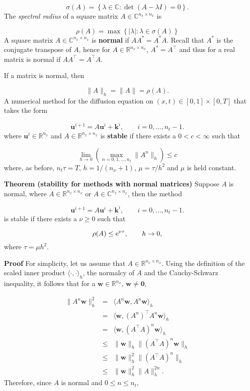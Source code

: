 \documentclass[12pt,a4paper]{article}
\begin{document}
\[
\sigma(A) = \left\lbrace \lambda \in \mathbb{C} : \det(A - \lambda I)= 0  \right\rbrace.
\]
The \emph{spectral radius} of a square matrix $A \in \mathbb{C}^{n_x \times n_x}$ is

\[
\rho(A) = \max\left\lbrace \vert \lambda \vert : \lambda \in \sigma(A)\right\rbrace
\]
A square matrix $A \in \mathbb{C}^{n_x \times n_x}$ is \textbf{normal} if $AA^{*} = A^{*}A$.  Recall that $A^*$ is the conjugate transpose of $A$, hence for  $A \in \mathbb{R}^{n_x \times n_x}$, $A^{*} = A^{\top}$ and thus for a real matrix is normal if $AA^{\top} = A^{\top}A$.

If a matrix is normal, then

\[
\| A \|_h =\| A \| = \rho(A).
\]
A numerical method for the diffusion equation on $(x,t)\in [0, 1]\times[0, T]$ that takes the form

\[
\mathbf{u}^{i+1} = A\mathbf{u}^i + \mathbf{k}^i, \qquad i = 0, \ldots, n_t-1.
\]
where $\mathbf{u}^i \in \mathbb{R}^{n_x}$ and $A \in \mathbb{R}^{n_x \times n_x}$ is \textbf{stable} if there exists a $0 < c < \infty$ such that

\[
\lim_{h \to 0}\left( \max_{n = 0, 1, \ldots, n_t} \| A^n \|_h  \right) \leq c
\]
where, as before, $n_t\tau = T$, $h = 1/(n_x + 1)$, $\mu = \tau/h^2$ and $\mu$ is held constant.

\textbf{Theorem (stability for methods with normal matrices)} Suppose $A$ is normal, where $A \in \mathbb{R}^{n_x \times n_x}$ or $A \in \mathbb{C}^{n_x \times n_x}$,  then the method 

\[
\mathbf{u}^{i+1} = A\mathbf{u}^i + \mathbf{k}^i, \qquad i = 0, \ldots, n_t-1.
\]
is stable if there exists a $\nu \geq 0$ such that

\[
\rho(A) \leq {\rm e}^{\nu \tau}, \qquad h \to 0,
\]
where $\tau = \mu h^2$. 

\textbf{Proof}  For simplicity, let us assume that $A \in \mathbb{R}^{n_x \times n_x}$.  Using the definition of the scaled inner product $\langle \cdot, \cdot \rangle_h$, the normalcy of $A$ and the Cauchy-Schwarz inequality, it follows that for a $\mathbf{w} \in \mathbb{R}^{n_x}$, $\mathbf{w} \neq \mathbf{0}$,


\begin{eqnarray*}
\| A^n \mathbf{w} \|_h^2 &=& \langle A^n\mathbf{w}, A^n\mathbf{w}\rangle_h \\
&=& \langle \mathbf{w},  \left(A^n\right)^{\top}A^n\mathbf{w}\rangle_h \\
&=&  \langle \mathbf{w},  \left(A^{\top}A\right)^n\mathbf{w}\rangle_h \\ 
&\leq & \|  \mathbf{w}\|_h \|\left(A^{\top}A\right)^n\mathbf{w}\|_h \\
&\leq & \|  \mathbf{w}\|_h^2 \|\left(A^{\top}A\right)^n\|_h \\
&\leq & \|  \mathbf{w}\|_h^2 \|A\|_h^{2n}.
\end{eqnarray*}
Therefore, since $A$ is normal and $0 \leq  n \leq n_t$,
\end{document}

